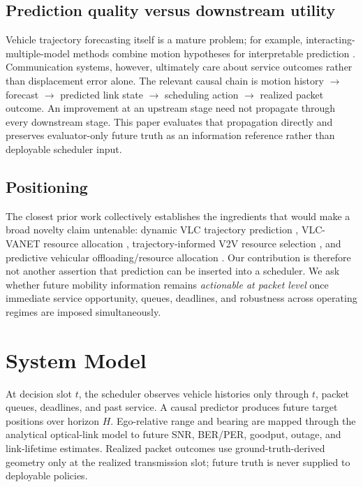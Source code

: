 \documentclass[conference]{IEEEtran}
\begin{document}
\subsection{Prediction quality versus downstream utility}
Vehicle trajectory forecasting itself is a mature problem; for example, interacting-multiple-model methods combine motion hypotheses for interpretable prediction \cite{gao2023imm}. Communication systems, however, ultimately care about service outcomes rather than displacement error alone. The relevant causal chain is motion history $\rightarrow$ forecast $\rightarrow$ predicted link state $\rightarrow$ scheduling action $\rightarrow$ realized packet outcome. An improvement at an upstream stage need not propagate through every downstream stage. This paper evaluates that propagation directly and preserves evaluator-only future truth as an information reference rather than deployable scheduler input.

\subsection{Positioning}
The closest prior work collectively establishes the ingredients that would make a broad novelty claim untenable: dynamic VLC trajectory prediction \cite{jiang2020trajectory}, VLC-VANET resource allocation \cite{msongaleli2020resource}, trajectory-informed V2V resource selection \cite{hajrasouliha2021trajectory}, and predictive vehicular offloading/resource allocation \cite{guo2022trajectoryoffload,lu2024predictive}. Our contribution is therefore not another assertion that prediction can be inserted into a scheduler. We ask whether future mobility information remains \emph{actionable at packet level} once immediate service opportunity, queues, deadlines, and robustness across operating regimes are imposed simultaneously.

\section{System Model}
At decision slot $t$, the scheduler observes vehicle histories only through $t$, packet queues, deadlines, and past service. A causal predictor produces future target positions over horizon $H$. Ego-relative range and bearing are mapped through the analytical optical-link model to future SNR, BER/PER, goodput, outage, and link-lifetime estimates. Realized packet outcomes use ground-truth-derived geometry only at the realized transmission slot; future truth is never supplied to deployable policies.
\end{document}
